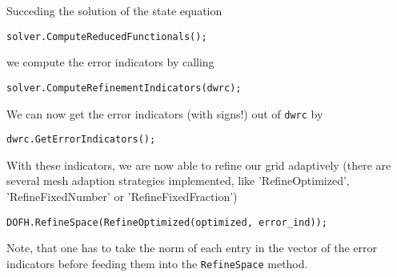 Succeding the solution of the state equation 
\begin{verbatim}
solver.ComputeReducedFunctionals(); 
\end{verbatim}
we compute the error indicators by calling 
\begin{verbatim}
solver.ComputeRefinementIndicators(dwrc);
\end{verbatim}
We can now get the error indicators (with signs!) out of \texttt{dwrc} by 
\begin{verbatim}
dwrc.GetErrorIndicators();
\end{verbatim}
With these indicators, we are now able to refine our grid adaptively (there are several mesh adaption strategies implemented, like 'RefineOptimized', 'RefineFixedNumber' or 'RefineFixedFraction')
\begin{verbatim}
DOFH.RefineSpace(RefineOptimized(optimized, error_ind));
\end{verbatim}
Note, that one has to take the norm of each entry in the vector of the error indicators before feeding them into the \texttt{RefineSpace} method.
